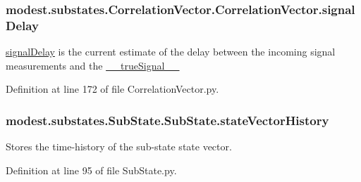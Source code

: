 \subsubsection[{\texorpdfstring{signal\+Delay}{signalDelay}}]{\setlength{\rightskip}{0pt plus 5cm}modest.\+substates.\+Correlation\+Vector.\+Correlation\+Vector.\+signal\+Delay}\hypertarget{classmodest_1_1substates_1_1CorrelationVector_1_1CorrelationVector_ab1dbedfba4787748c5778359b78dc3cf}{}\label{classmodest_1_1substates_1_1CorrelationVector_1_1CorrelationVector_ab1dbedfba4787748c5778359b78dc3cf}


\hyperlink{classmodest_1_1substates_1_1CorrelationVector_1_1CorrelationVector_ab1dbedfba4787748c5778359b78dc3cf}{signal\+Delay} is the current estimate of the delay between the incoming signal measurements and the \hyperlink{classmodest_1_1substates_1_1CorrelationVector_1_1CorrelationVector_a40f65c10e255c043d8f56d17d152e705}{\+\_\+\+\_\+true\+Signal\+\_\+\+\_\+} 



Definition at line 172 of file Correlation\+Vector.\+py.

\subsubsection[{\texorpdfstring{state\+Vector\+History}{stateVectorHistory}}]{\setlength{\rightskip}{0pt plus 5cm}modest.\+substates.\+Sub\+State.\+Sub\+State.\+state\+Vector\+History\hspace{0.3cm}{\ttfamily [inherited]}}\hypertarget{classmodest_1_1substates_1_1SubState_1_1SubState_acb24540b23c1fb76233b6b4ff5bf47ce}{}\label{classmodest_1_1substates_1_1SubState_1_1SubState_acb24540b23c1fb76233b6b4ff5bf47ce}


Stores the time-\/history of the sub-\/state state vector. 



Definition at line 95 of file Sub\+State.\+py.

